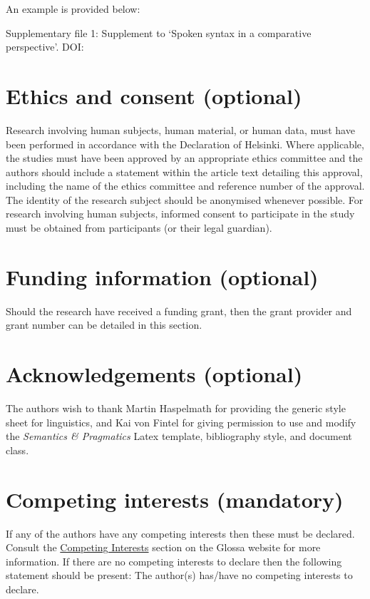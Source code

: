 \documentclass[charis,linguex]{glossa}
\begin{document}
An example is provided below:

\noindent Supplementary file 1: Supplement to ‘Spoken syntax in a comparative perspective’. DOI: 

\section*{Ethics and consent (optional)}

Research involving human subjects, human material, or human data, must have been performed in accordance with the Declaration of Helsinki. Where applicable, the studies must have been approved by an appropriate ethics committee and the authors should include a statement within the article text detailing this approval, including the name of the ethics committee and reference number of the approval. The identity of the research subject should be anonymised whenever possible. For research involving human subjects, informed consent to participate in the study must be obtained from participants (or their legal guardian).


\section*{Funding information (optional)}

Should the research have received a funding grant, then the grant provider and grant number can be detailed in this section. 

\section*{Acknowledgements (optional)}

The authors wish to thank Martin Haspelmath for providing the generic style sheet for linguistics, and Kai von Fintel for giving permission to use and modify the \textit{Semantics \& Pragmatics} Latex template, bibliography style, and document class.

\section*{Competing interests (mandatory)}

If any of the authors have any competing interests then these must be declared. Consult the \href{http://www.glossa-journal.org/about/competinginterests/}{Competing Interests} section on the Glossa website for more information. If there are no competing interests to declare then the following statement should be present: The author(s) has/have no competing interests to declare.
\end{document}
